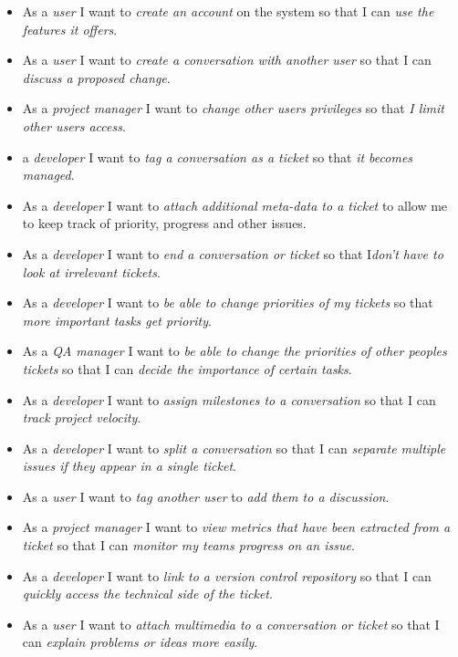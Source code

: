 \documentclass[a4paper]{l3proj}
\begin{document}
  \begin{itemize}
  \item As a \textit{user} I want to \textit{create an account} on the system so that I can \textit{use the features it offers}.
  \item As a \textit{user} I want to \textit{create a conversation with another user} so that I can \textit{discuss a proposed change}.
  \item As a \textit{project manager} I want to \textit{change other users privileges} so that \textit{I limit other users access}.
  \item  a \textit{developer} I want to \textit{tag a conversation as a ticket} so that \textit{it becomes managed}.
  \item As a \textit{developer} I want to \textit{attach additional meta-data to a ticket} to allow me to keep track of priority, progress and other issues.
  \item As a \textit{developer} I want to \textit{end a conversation or ticket} so that I\textit{don't have to look at irrelevant tickets}.
  \item As a \textit{developer} I want to \textit{be able to change priorities of my tickets} so that \textit{more important tasks get priority}.
  \item As a \textit{QA manager} I want to \textit{be able to change the priorities of other peoples tickets} so that I can \textit{decide the importance of certain tasks}.
  \item As a \textit{developer} I want to \textit{assign milestones to a conversation} so that I can \textit{track project velocity}.
  \item As a \textit{developer} I want to \textit{split a conversation} so that I can \textit{separate multiple issues if they appear in a single ticket}.
  \item As a \textit{user} I want to \textit{tag another user} to \textit{add them to a discussion}.
  \item As a \textit{project manager} I want to \textit{view metrics that have been extracted from a ticket} so that I can \textit{monitor my teams progress on an issue}.
  \item As a \textit{developer} I want to \textit{link to a version control repository} so that I can \textit{quickly access the technical side of the ticket}.
  \item As a \textit{user} I want to \textit{attach multimedia to a conversation or ticket} so that I can \textit{explain problems or ideas more easily}.

\end{itemize}
\end{document}
